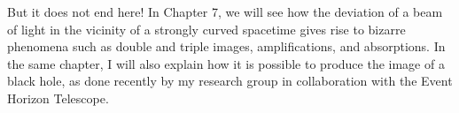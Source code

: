 But it does not end here! In Chapter 7, we will see how the deviation of a beam of light
in the vicinity of a strongly curved spacetime gives rise to bizarre phenomena such as
double and triple images, amplifications, and absorptions. In the same chapter, I will
also explain how it is possible to produce the image of a black hole, as done recently
by my research group in collaboration with the Event Horizon Telescope.
